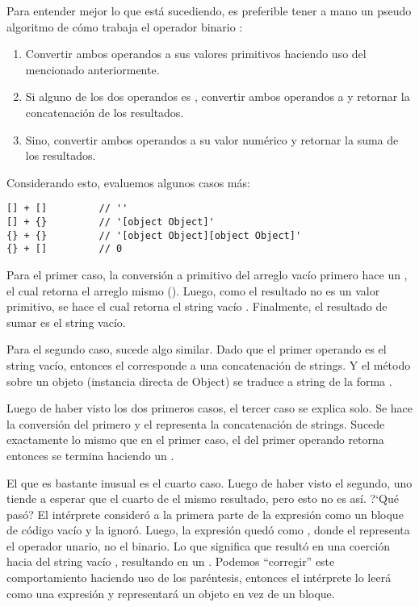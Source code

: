 Para entender mejor lo que está sucediendo, es preferible tener a mano un pseudo algoritmo de cómo trabaja el operador binario \code{+}:

\begin{enumerate}
\item Convertir ambos operandos a sus valores primitivos haciendo uso del  mencionado anteriormente.
\item Si alguno de los dos operandos es , convertir ambos operandos a  y retornar la concatenación de los resultados.
\item Sino, convertir ambos operandos a su valor numérico y retornar la suma de los resultados.
\end{enumerate}

Considerando esto, evaluemos algunos casos más:

\begin{lstlisting}[title={Operador \code{+} con arreglos y objetos}]
[] + []			// ''
[] + {}			// '[object Object]'
{} + {}			// '[object Object][object Object]'
{} + []			// 0
\end{lstlisting}

Para el primer caso, la conversión a primitivo del arreglo vacío \code{[]} primero hace un , el cual retorna el arreglo mismo (). Luego, como el resultado no es un valor primitivo, se hace  el cual retorna el string vacío . Finalmente, el resultado de sumar \code{[] + []} es el string vacío.

Para el segundo caso, sucede algo similar. Dado que el primer operando es el string vacío, entonces el \code{+} corresponde a una concatenación de strings. Y el método  sobre un objeto (instancia directa de Object) se traduce a string de la forma .

Luego de haber visto los dos primeros casos, el tercer caso se explica solo. Se hace la conversión del primero y el \code{+} representa la concatenación de strings. Sucede exactamente lo mismo que en el primer caso, el  del primer operando retorna  entonces se termina haciendo un .

El que es bastante inusual es el cuarto caso. Luego de haber visto el segundo, uno tiende a esperar que el cuarto de el mismo resultado, pero esto no es así. ?`Qué pasó? El intérprete consideró a la primera parte de la expresión como un bloque de código vacío y la ignoró. Luego, la expresión quedó como \code{+[]}, donde el \code{+} representa el operador unario, no el binario. Lo que significa que resultó en una coerción hacia  del string vacío , resultando en un . Podemos "`corregir"' este comportamiento haciendo uso de los paréntesis, entonces el intérprete lo leerá como una expresión y \code{\{\}} representará un objeto en vez de un bloque.

